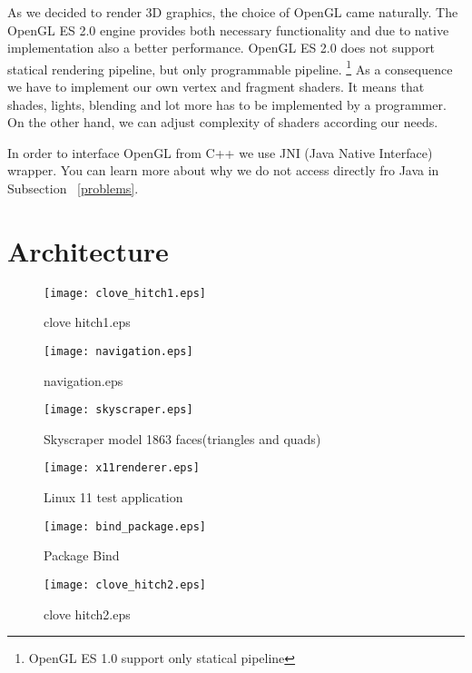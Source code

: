 As we decided to render 3D graphics, the choice of OpenGL came naturally.
The OpenGL ES 2.0 engine provides both necessary functionality and due to
native implementation also a better performance.
OpenGL ES 2.0 does not support statical rendering pipeline, 
but only programmable pipeline. \footnote{OpenGL ES 1.0 support only statical pipeline}
As a consequence we have to implement our own vertex and fragment shaders.
It means that shades, lights, blending and lot more has to be implemented by a programmer.
On the other hand, we can adjust complexity of shaders according our needs.

In order to interface OpenGL from C++ we use JNI (Java Native Interface) wrapper.
You can learn more about why we do not access directly fro Java in Subsection ~\ref{problems}.


\section*{Architecture} %
\label{sec:Architecture}


\begin{figure}
\texttt{[image: clove\_hitch1.eps]}
\label{pic:clove_hitch1.eps}
\caption{clove hitch1.eps}
\end{figure}

\begin{figure}
\texttt{[image: navigation.eps]}
\label{pic:navigation.eps}
\caption{navigation.eps}
\end{figure}

\begin{figure}
\texttt{[image: skyscraper.eps]}
\label{pic:skyscraper.eps}
\caption{Skyscraper model 1863 faces(triangles and quads)}
\end{figure}

\begin{figure}
\texttt{[image: x11renderer.eps]}
\label{pic:x11renderer.eps}
\caption{Linux 11 test application}
\end{figure}

\begin{figure}
\texttt{[image: bind\_package.eps]}
\label{pic:bind_package.eps}
\caption{Package Bind}
\end{figure}

\begin{figure}
\texttt{[image: clove\_hitch2.eps]}
\label{pic:clove_hitch2.eps}
\caption{clove hitch2.eps}
\end{figure}

